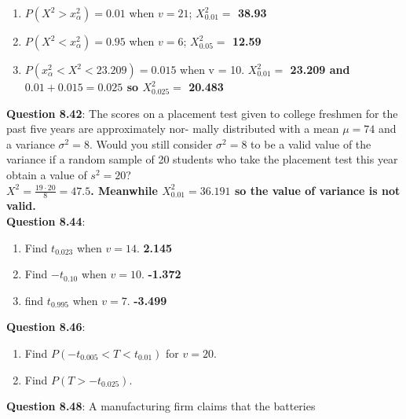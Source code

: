 \documentclass{article}
\begin{document}
        \begin{enumerate}[label = (\alph*) ]
            \item $P(X^2 > x^{2}_{\alpha}) = 0.01$ when $v = 21$;\newline
                \textbf{$X_{0.01}^{2} = $ 38.93}
            \item $P(X^2 < x^{2}_{\alpha}) = 0.95$ when $v = 6$;\newline
                \textbf{$X_{0.05}^{2} = $ 12.59}
            \item $P(x^{2}_{\alpha} < X^2 < 23.209) = 0.015$ when v = 10.\newline
                \textbf{$X_{0.01}^{2}= $ 23.209 and $0.01 + 0.015 = 0.025$ so $X_{0.025}^{2}= $ 20.483}
        \end{enumerate}
    \textbf{Question 8.42}: The scores on a placement test given to college
    freshmen for the past five years are approximately nor-
    mally distributed with a mean $\mu = 74$ and a variance
    $\sigma^2 = 8$. Would you still consider $\sigma^2 = 8$ to be a valid
    value of the variance if a random sample of 20 students
    who take the placement test this year obtain a value of
    $s^2 = 20$?\\\newline
        \textbf{$X^2 = \frac{19\cdot20}{8} = 47.5$. Meanwhile $X_{0.01}^{2} = 36.191$
        so the value of variance is not valid.}\\\newline
    \textbf{Question 8.44}:
        \begin{enumerate}[label = (\alph*) ]
            \item Find $t_{0.023}$ when $v = 14$.\newline
                \textbf{2.145}
            \item Find $-t_{0.10}$ when $v = 10$.\newline
                \textbf{-1.372}
            \item find $t_0.995$ when $v = 7$.\newline
                \textbf{-3.499}
        \end{enumerate}
    \textbf{Question 8.46}:
        \begin{enumerate}[label = (\alph*) ]
            \item Find $P(-t_{0.005} < T < t_{0.01})$ for $v = 20$.
            \item Find $P(T > -t_{0.025})$.
        \end{enumerate}
    \textbf{Question 8.48}: A manufacturing firm claims that the batteries
\end{document}
